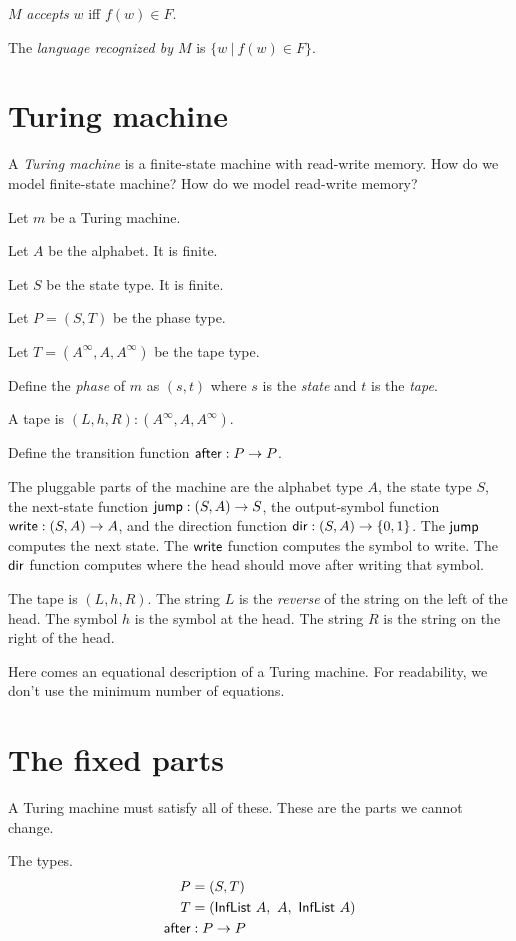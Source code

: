 \(M\) \emph{accepts} \(w\) iff \(f(w) \in F\).

The \emph{language recognized by \(M\)} is \(\{ w ~|~ f(w) \in F \}\).

\section{Turing machine}

A \emph{Turing machine} is a finite-state machine with read-write memory.
How do we model finite-state machine?
How do we model read-write memory?

Let \(m\) be a Turing machine.

Let \(A\) be the alphabet.
It is finite.

Let \(S\) be the state type.
It is finite.

Let \(P = (S,T)\) be the phase type.

Let \(T = (A^\infty,A,A^\infty)\) be the tape type.

Define the \emph{phase} of \(m\) as \((s,t)\)
where \(s\) is the \emph{state} and \(t\) is the \emph{tape}.

A tape is \((L,h,R) : (A^\infty,A,A^\infty)\).

Define the transition function \(\textsf{after} : P \to P\).

The pluggable parts of the machine are
the alphabet type \(A\),
the state type \(S\),
the next-state function \(\textsf{jump} : (S,A) \to S\),
the output-symbol function \(\textsf{write} : (S,A) \to A\),
and the direction function \(\textsf{dir} : (S,A) \to \{0,1\}\).
The \(\textsf{jump}\) computes the next state.
The \(\textsf{write}\) function computes the symbol to write.
The \(\textsf{dir}\) function computes where the head should move after writing that symbol.

The tape is \((L,h,R)\).
The string \(L\) is the \emph{reverse} of the string on the left of the head.
The symbol \(h\) is the symbol at the head.
The string \(R\) is the string on the right of the head.

Here comes an equational description of a Turing machine.
For readability, we don't use the minimum number of equations.

\section{The fixed parts}

A Turing machine must satisfy all of these.
These are the parts we cannot change.

The types.
\begin{align}
    P &= (S,T)
    \\
    T &= (\textsf{InfList}~A, ~ A, ~ \textsf{InfList}~A)
    \\
    \textsf{after} &: P \to P
\end{align}

